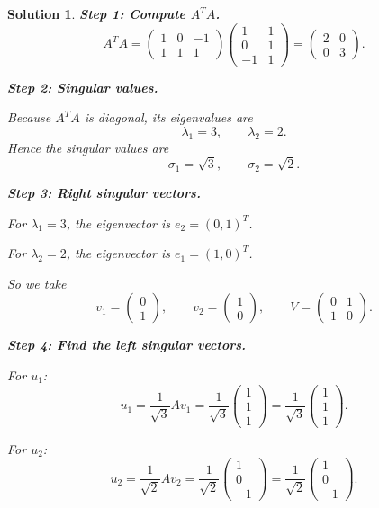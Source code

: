 \documentclass[11pt,a4paper]{article}
\theoremstyle{sol}
\newtheorem*{solution}{Solution}
\begin{document}
\begin{solution}
\textbf{Step 1: Compute $A^TA$.}
\[
A^TA=
\begin{pmatrix}
1&0&-1\\
1&1&1
\end{pmatrix}
\begin{pmatrix}
1&1\\
0&1\\
-1&1
\end{pmatrix}
=
\begin{pmatrix}
2&0\\
0&3
\end{pmatrix}.
\]

\textbf{Step 2: Singular values.}

Because $A^TA$ is diagonal, its eigenvalues are
\[
\lambda_1=3,\qquad \lambda_2=2.
\]
Hence the singular values are
\[
\sigma_1=\sqrt3,\qquad \sigma_2=\sqrt2.
\]

\textbf{Step 3: Right singular vectors.}

For $\lambda_1=3$, the eigenvector is $e_2=(0,1)^T$.

For $\lambda_2=2$, the eigenvector is $e_1=(1,0)^T$.

So we take
\[
v_1=\begin{pmatrix}0\\1\end{pmatrix},
\qquad
v_2=\begin{pmatrix}1\\0\end{pmatrix},
\qquad
V=
\begin{pmatrix}
0&1\\
1&0
\end{pmatrix}.
\]

\textbf{Step 4: Find the left singular vectors.}

For $u_1$:
\[
u_1=\frac{1}{\sqrt3}Av_1
=\frac{1}{\sqrt3}
\begin{pmatrix}1\\1\\1\end{pmatrix}
=\frac{1}{\sqrt3}\begin{pmatrix}1\\1\\1\end{pmatrix}.
\]

For $u_2$:
\[
u_2=\frac{1}{\sqrt2}Av_2
=\frac{1}{\sqrt2}
\begin{pmatrix}1\\0\\-1\end{pmatrix}
=\frac{1}{\sqrt2}\begin{pmatrix}1\\0\\-1\end{pmatrix}.
\]


\end{solution}
\end{document}
